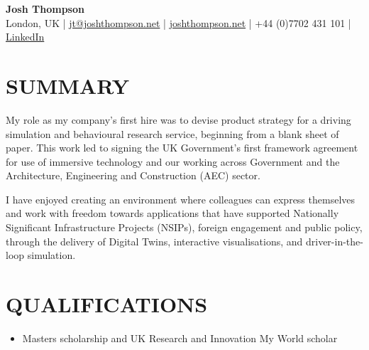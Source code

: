 \documentclass[a4paper,9pt]{extarticle}
\begin{document}
\begin{center}
  \textbf{\Large Josh Thompson} \\[3pt]
    London, UK | \href{mailto:jt@joshthompson.net}{jt@joshthompson.net} | \href{http://joshthompson.net}{joshthompson.net} | +44 (0)7702 431 101 | \href{https://www.linkedin.com/in/josh-thompson-516328170/}{LinkedIn}
\end{center}

\section*{SUMMARY}
My role as my company's first hire was to devise product strategy for a driving simulation and behavioural research service, beginning from a blank sheet of paper. This work led to signing the UK Government's first framework agreement for use of immersive technology and our working across Government and the Architecture, Engineering and Construction (AEC) sector.

I have enjoyed creating an environment where colleagues can express themselves and work with freedom towards applications that have supported Nationally Significant Infrastructure Projects (NSIPs), foreign engagement and public policy, through the delivery of Digital Twins, interactive visualisations, and driver-in-the-loop simulation.

\section*{QUALIFICATIONS}
\begin{itemize}
    \item Masters scholarship and UK Research and Innovation My World scholar
\end{itemize}

\end{document}

